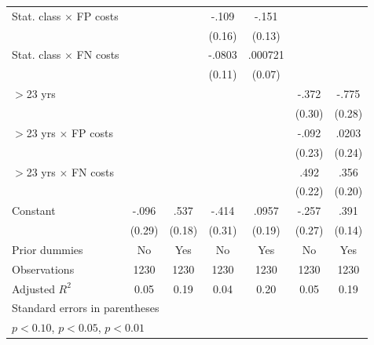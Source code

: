 \begin{table}[htbp]
\begin{tabular}{l*{6}{c}}
Stat. class $\times$ FP costs&                  &                  &    -.109         &    -.151         &                  &                  \\
                &                  &                  &   (0.16)         &   (0.13)         &                  &                  \\
Stat. class $\times$ FN costs&                  &                  &   -.0803         &  .000721         &                  &                  \\
                &                  &                  &   (0.11)         &   (0.07)         &                  &                  \\
$>$23 yrs       &                  &                  &                  &                  &    -.372         &    -.775\sym{***}\\
                &                  &                  &                  &                  &   (0.30)         &   (0.28)         \\
$>$23 yrs $\times$ FP costs&                  &                  &                  &                  &    -.092         &    .0203         \\
                &                  &                  &                  &                  &   (0.23)         &   (0.24)         \\
$>$23 yrs $\times$ FN costs&                  &                  &                  &                  &     .492\sym{**} &     .356\sym{*}  \\
                &                  &                  &                  &                  &   (0.22)         &   (0.20)         \\
Constant        &    -.096         &     .537\sym{***}&    -.414         &    .0957         &    -.257         &     .391\sym{***}\\
                &   (0.29)         &   (0.18)         &   (0.31)         &   (0.19)         &   (0.27)         &   (0.14)         \\
Prior dummies   &       No         &      Yes         &       No         &      Yes         &       No         &      Yes         \\
\hline
Observations    &     1230         &     1230         &     1230         &     1230         &     1230         &     1230         \\
Adjusted \(R^{2}\)&     0.05         &     0.19         &     0.04         &     0.20         &     0.05         &     0.19         \\
\hline\hline
\multicolumn{7}{l}{\footnotesize Standard errors in parentheses}\\
\multicolumn{7}{l}{\footnotesize \sym{*} \(p<0.10\), \sym{**} \(p<0.05\), \sym{***} \(p<0.01\)}\\
\end{tabular}
\end{table}
